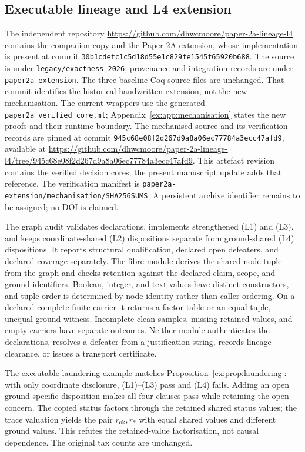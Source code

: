 \documentclass[11pt]{article}
\theoremstyle{definition}
\begin{document}
\subsection{Executable lineage and L4 extension}\label{ex:app:extension}
The independent repository \url{https://github.com/dhwcmoore/paper-2a-lineage-l4} contains the companion copy and the Paper 2A extension, whose implementation is present at commit \nolinkurl{30b1cdefc1c5d18d55e1c829fe1545f65920b688}. The source is under \nolinkurl{legacy/exactness-2026}; provenance and integration records are under \nolinkurl{paper2a-extension}. The three baseline Coq source files are unchanged. That commit identifies the historical handwritten extension, not the new mechanisation. The current wrappers use the generated \nolinkurl{paper2a_verified_core.ml}; Appendix~\ref{ex:app:mechanisation} states the new proofs and their runtime boundary. The mechanised source and its verification records are pinned at commit \nolinkurl{945c68e08f2d267d9a8a06ec77784a3ecc47afd9}, available at \url{https://github.com/dhwcmoore/paper-2a-lineage-l4/tree/945c68e08f2d267d9a8a06ec77784a3ecc47afd9}. This artefact revision contains the verified decision cores; the present manuscript update adds that reference. The verification manifest is \nolinkurl{paper2a-extension/mechanisation/SHA256SUMS}. A persistent archive identifier remains to be assigned; no DOI is claimed.

The graph audit validates declarations, implements strengthened (L1) and (L3), and keeps coordinate-shared (L2) dispositions separate from ground-shared (L4) dispositions. It reports structural qualification, declared open defeaters, and declared coverage separately. The fibre module derives the shared-node tuple from the graph and checks retention against the declared claim, scope, and ground identifiers. Boolean, integer, and text values have distinct constructors, and tuple order is determined by node identity rather than caller ordering. On a declared complete finite carrier it returns a factor table or an equal-tuple, unequal-ground witness. Incomplete clean samples, missing retained values, and empty carriers have separate outcomes. Neither module authenticates the declarations, resolves a defeater from a justification string, records lineage clearance, or issues a transport certificate.

The executable laundering example matches Proposition~\ref{ex:prop:laundering}: with only coordinate disclosure, (L1)--(L3) pass and (L4) fails. Adding an open ground-specific disposition makes all four clauses pass while retaining the open concern. The copied status factors through the retained shared status values; the trace valuation yields the pair $r_{\mathrm{ok}},r_*$ with equal shared values and different ground values. This refutes the retained-value factorisation, not causal dependence. The original tax counts are unchanged.
\end{document}
